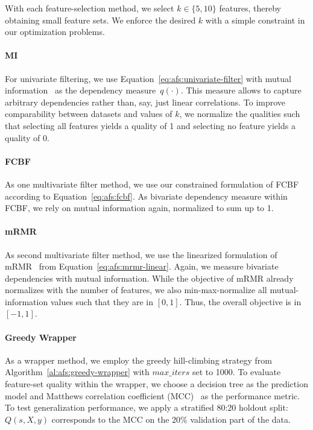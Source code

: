 \documentclass{article}
\theoremstyle{definition}
\begin{document}
With each feature-selection method, we select $k \in \{5,10\}$ features, thereby obtaining small feature sets.
We enforce the desired $k$ with a simple constraint in our optimization problems.

\paragraph{MI}

For univariate filtering, we use Equation~\ref{eq:afs:univariate-filter} with mutual information~\cite{kraskov2004estimating} as the dependency measure~$q(\cdot)$.
This measure allows to capture arbitrary dependencies rather than, say, just linear correlations.
To improve comparability between datasets and values of $k$, we normalize the qualities such that selecting all features yields a quality of 1 and selecting no feature yields a quality of 0.

\paragraph{FCBF}

As one multivariate filter method, we use our constrained formulation of FCBF~\cite{yu2003feature} according to Equation~\ref{eq:afs:fcbf}.
As bivariate dependency measure within FCBF, we rely on mutual information again, normalized to sum up to 1.

\paragraph{mRMR}

As second multivariate filter method, we use the linearized formulation of mRMR~\cite{peng2005feature} from Equation~\ref{eq:afs:mrmr-linear}.
Again, we measure bivariate dependencies with mutual information.
While the objective of mRMR already normalizes with the number of features, we also min-max-normalize all mutual-information values such that they are in $[0,1]$.
Thus, the overall objective is in $[-1,1]$.

\paragraph{Greedy Wrapper}

As a wrapper method, we employ the greedy hill-climbing strategy from Algorithm~\ref{al:afs:greedy-wrapper} with $max\_iters$ set to 1000.
To evaluate feature-set quality within the wrapper, we choose a decision tree as the prediction model and Matthews correlation coefficient (MCC)~\cite{matthews1975comparison} as the performance metric.
To test generalization performance, we apply a stratified 80:20 holdout split:
$Q(s,X,y)$ corresponds to the MCC on the 20\% validation part of the data.
\end{document}
